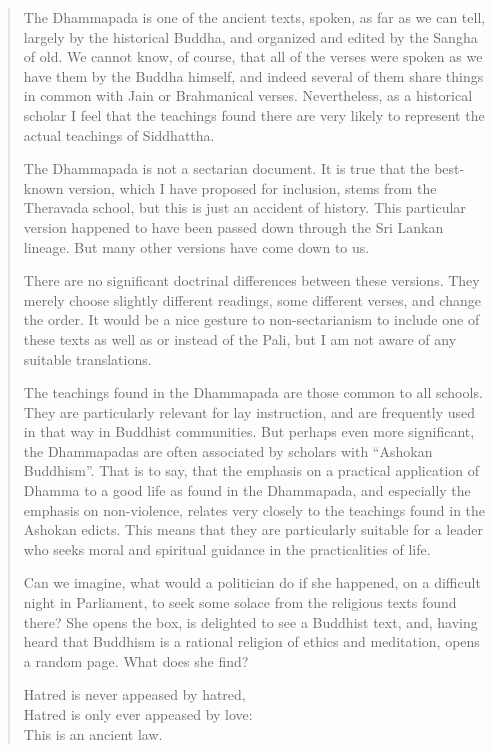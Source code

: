 \documentclass[12pt,openany]{book}%
\begin{document}
\begin{quotation}%
The Dhammapada is one of the ancient texts, spoken, as far as we can tell, largely by the historical Buddha, and organized and edited by the Sangha of old. We cannot know, of course, that all of the verses were spoken as we have them by the Buddha himself, and indeed several of them share things in common with Jain or Brahmanical verses. Nevertheless, as a historical scholar I feel that the teachings found there are very likely to represent the actual teachings of Siddhattha.

The Dhammapada is not a sectarian document. It is true that the best-known version, which I have proposed for inclusion, stems from the Theravada school, but this is just an accident of history. This particular version happened to have been passed down through the Sri Lankan lineage. But many other versions have come down to us.

There are no significant doctrinal differences between these versions. They merely choose slightly different readings, some different verses, and change the order. It would be a nice gesture to non-sectarianism to include one of these texts as well as or instead of the Pali, but I am not aware of any suitable translations.

The teachings found in the Dhammapada are those common to all schools. They are particularly relevant for lay instruction, and are frequently used in that way in Buddhist communities. But perhaps even more significant, the Dhammapadas are often associated by scholars with “Ashokan Buddhism”. That is to say, that the emphasis on a practical application of Dhamma to a good life as found in the Dhammapada, and especially the emphasis on non-violence, relates very closely to the teachings found in the Ashokan edicts. This means that they are particularly suitable for a leader who seeks moral and spiritual guidance in the practicalities of life.

Can we imagine, what would a politician do if she happened, on a difficult night in Parliament, to seek some solace from the religious texts found there? She opens the box, is delighted to see a Buddhist text, and, having heard that Buddhism is a rational religion of ethics and meditation, opens a random page. What does she find?

Hatred is never appeased by hatred, \\
Hatred is only ever appeased by love: \\
This is an ancient law.

%
\end{quotation}
\end{document}
